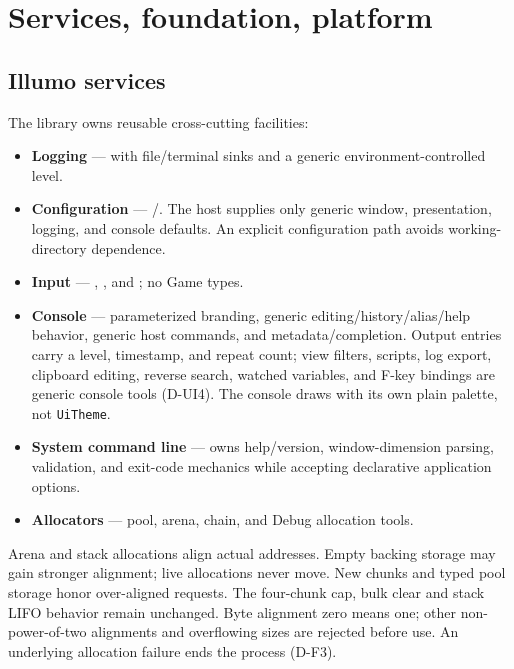 \section{Services, foundation, platform}
\label{sec:services}

\subsection{Illumo services}
The library owns reusable cross-cutting facilities:
\begin{itemize}
  \item \textbf{Logging} ---  with file/terminal sinks and a
        generic environment-controlled level.
  \item \textbf{Configuration} --- /.
        The host supplies only generic window, presentation, logging, and console
        defaults. An explicit configuration path avoids working-directory
        dependence.
  \item \textbf{Input} --- , ,
        and ; no Game types.
  \item \textbf{Console} --- parameterized  branding,
        generic editing/history/alias/help behavior, generic host commands, and
         metadata/completion. Output entries carry a
        level, timestamp, and repeat count; view filters, scripts, log export,
        clipboard editing, reverse search, watched variables, and F-key
        bindings are generic console tools
        (D-UI4). The console draws with its own plain palette, not
        \texttt{UiTheme}.
  \item \textbf{System command line} ---  owns
        help/version, window-dimension parsing, validation, and exit-code
        mechanics while accepting declarative application options.
  \item \textbf{Allocators} --- pool, arena, chain, and Debug allocation tools.
\end{itemize}

Arena and stack allocations align actual addresses. Empty backing storage may
gain stronger alignment; live allocations never move. New chunks and typed
pool storage honor over-aligned requests. The four-chunk cap, bulk clear and
stack LIFO behavior remain unchanged. Byte alignment zero means one; other
non-power-of-two alignments and overflowing sizes are rejected before use.
An underlying allocation failure ends the process (D-F3).

